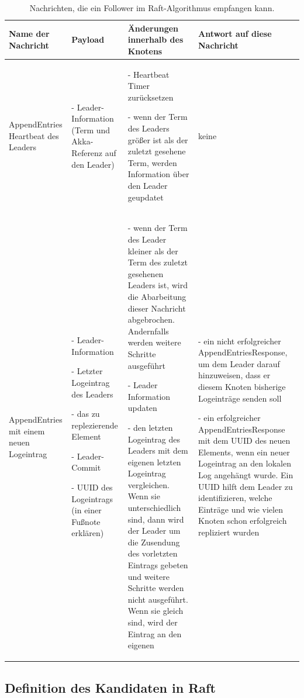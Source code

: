 \begin{table} \centering
	\begin{tabular}{|p{2.5cm}|p{3.5cm}|p{4cm}|p{4.5cm}|} 
		\hline
		\textbf{Name der Nachricht} & \textbf{Payload} & \textbf{Änderungen innerhalb des Knotens} & \textbf{Antwort auf diese Nachricht}\\
		
		\hline
		AppendEntries Heartbeat des Leaders & 
		- Leader-Information (Term und Akka-Referenz auf den Leader) & 
		- Heartbeat Timer zurücksetzen
		
		- wenn der Term des Leaders größer ist als der zuletzt gesehene Term, werden Information über den Leader geupdatet & keine\\
		
		\hline
		AppendEntries mit einem neuen Logeintrag & - Leader-Information
		
		- Letzter Logeintrag des Leaders
		
		- das zu replezierende Element
		
		- Leader-Commit
		
		- UUID des Logeintrags (in einer Fußnote erklären) 
		& - wenn der Term des Leader kleiner als der Term des zuletzt gesehenen Leaders ist, wird die Abarbeitung dieser Nachricht abgebrochen. Andernfalls werden weitere Schritte ausgeführt
		
		- Leader Information updaten
		
		- den letzten Logeintrag des Leaders mit dem eigenen letzten Logeintrag vergleichen. Wenn sie unterschiedlich sind, dann wird der Leader um die Zusendung des vorletzten Eintrags gebeten und weitere Schritte werden nicht ausgeführt. Wenn sie gleich sind, wird der Eintrag an den eigenen 
		 & - ein nicht erfolgreicher AppendEntriesResponse, um dem Leader darauf hinzuweisen, dass er diesem Knoten bisherige Logeinträge senden soll
		 
		 - ein erfolgreicher AppendEntriesResponse mit dem UUID des neuen Elements, wenn ein neuer Logeintrag an den lokalen Log angehängt wurde. Ein UUID hilft dem Leader zu identifizieren, welche Einträge und wie vielen Knoten schon erfolgreich repliziert wurden\\
		
		\hline
	\end{tabular}
	\caption{Nachrichten, die ein Follower im Raft-Algorithmus empfangen kann.}
	\label{tab:followerReceive}
\end{table}

\subsection{Definition des Kandidaten in Raft}

